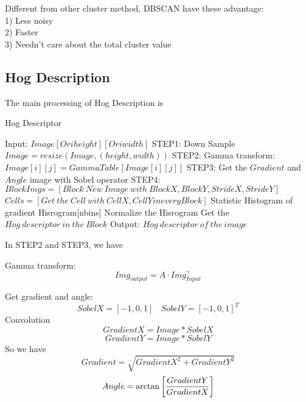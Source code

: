 \documentclass[12pt]{article}
\theoremstyle{plain}
\begin{document}
Different from other cluster method, DBSCAN have these advantage:
\\1) Less noisy
\\2) Faster
\\3) Needn't care about the total cluster value



\subsection{Hog Description}
The main processing of Hog Description is 
\begin{algorithm}[H]
\caption{Hog Descriptor}
\begin{algorithmic}
\State Input: $Image[Oriheight][Oriwidth]$
\State STEP1: Down Sample $Image = resize(Image, (height, width))$
\State STEP2: Gamma transform: $Image[i][j] = GammaTable[Image[i][j]]$
\State STEP3: Get the $Gradient$ and $Angle$ image with Sobel operator
\State STEP4: $BlockImgs = [Block\ New\ Image\ with\ BlockX, BlockY, StrideX, StrideY]$
\State $Cells = [Get\ the\ Cell\ with\ CellX, CellY in every Block]$
\State Statistic Histogram of gradient Hisrogram[nbins]
\State Normalize the Hisrogram
\EndFor
\State Get the $Hog\ descriptor\ in\ the\ Block$
\EndFor
\State Output: $Hog\ descriptor\ of\ the\ image$

\end{algorithmic}
\end{algorithm}

In STEP2 and STEP3, we have

Gamma transform:
\begin{displaymath}
Img_{output} = A\cdot Img_{Input}^{\gamma}
\end{displaymath}

Get gradient and angle:
\begin{displaymath}
SobelX = [-1, 0, 1]\ \ \ \ SobelY = [-1, 0, 1]^{T}
\end{displaymath}
Convolution
\begin{displaymath}
GradientX = Image \ast SobelX
\end{displaymath}
\begin{displaymath}
GradientY = Image \ast SobelY
\end{displaymath}
So we have 
\begin{displaymath}
Gradient = \sqrt{GradientX^2 + GradientY^2}
\end{displaymath}
\begin{displaymath}
Angle = \arctan\left[GradientY \over GradientX\right]
\end{displaymath}
\end{document}
